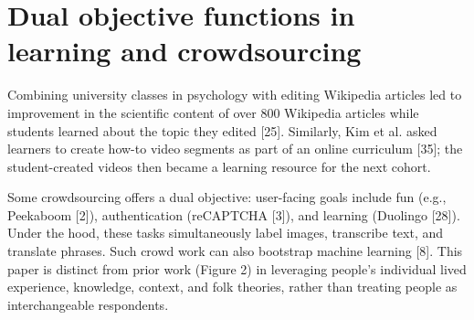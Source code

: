 \section{Dual objective functions in learning and crowdsourcing}
Combining university classes in psychology with editing
Wikipedia articles led to improvement in the scientific
content of over 800 Wikipedia articles while students
learned about the topic they edited [25]. Similarly, Kim et
al. asked learners to create how-to video segments as part
of an online curriculum [35]; the student-created videos
then became a learning resource for the next cohort. 

Some crowdsourcing offers a dual objective: user-facing
goals include fun (e.g., Peekaboom [2]), authentication
(reCAPTCHA [3]), and learning (Duolingo [28]). Under the
hood, these tasks simultaneously label images, transcribe
text, and translate phrases. Such crowd work can also bootstrap machine learning [8]. This paper is distinct from prior
work (Figure 2) in leveraging people’s individual lived
experience, knowledge, context, and folk theories, rather
than treating people as interchangeable respondents.
